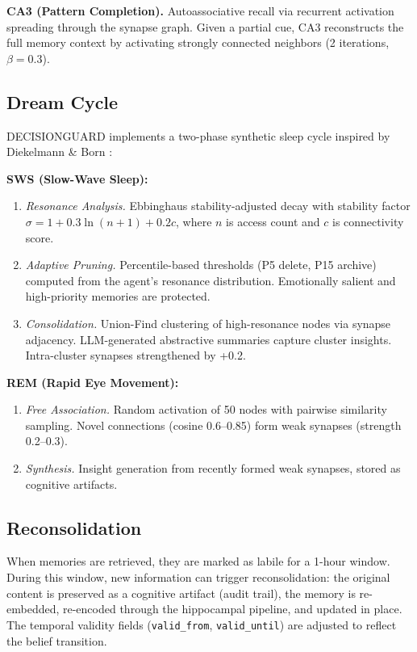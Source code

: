 \documentclass{article}
\begin{document}
\textbf{CA3 (Pattern Completion).} Autoassociative recall via recurrent activation spreading through the synapse graph. Given a partial cue, CA3 reconstructs the full memory context by activating strongly connected neighbors (2 iterations, $\beta = 0.3$).

\subsection{Dream Cycle}

DECISIONGUARD implements a two-phase synthetic sleep cycle inspired by Diekelmann \& Born \citep{diekelmann2010memory}:

\textbf{SWS (Slow-Wave Sleep):}
\begin{enumerate}[nosep]
  \item \emph{Resonance Analysis.} Ebbinghaus stability-adjusted decay with stability factor $\sigma = 1 + 0.3\ln(n+1) + 0.2c$, where $n$ is access count and $c$ is connectivity score.
  \item \emph{Adaptive Pruning.} Percentile-based thresholds (P5 delete, P15 archive) computed from the agent's resonance distribution. Emotionally salient and high-priority memories are protected.
  \item \emph{Consolidation.} Union-Find clustering of high-resonance nodes via synapse adjacency. LLM-generated abstractive summaries capture cluster insights. Intra-cluster synapses strengthened by +0.2.
\end{enumerate}

\textbf{REM (Rapid Eye Movement):}
\begin{enumerate}[nosep,start=4]
  \item \emph{Free Association.} Random activation of 50 nodes with pairwise similarity sampling. Novel connections (cosine 0.6--0.85) form weak synapses (strength 0.2--0.3).
  \item \emph{Synthesis.} Insight generation from recently formed weak synapses, stored as cognitive artifacts.
\end{enumerate}

\subsection{Reconsolidation}

When memories are retrieved, they are marked as labile for a 1-hour window. During this window, new information can trigger reconsolidation: the original content is preserved as a cognitive artifact (audit trail), the memory is re-embedded, re-encoded through the hippocampal pipeline, and updated in place. The temporal validity fields (\texttt{valid\_from}, \texttt{valid\_until}) are adjusted to reflect the belief transition.
\end{document}
